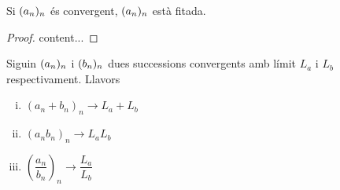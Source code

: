 \begin{prop}
	Si $({a}_n)_{n}$ és convergent, $({a}_n)_{n}$ està fitada.
	\begin{proof}
		content...
	\end{proof}
\end{prop}

\begin{prop}
	Siguin $({a}_n)_{n}$ i $({b}_n)_{n}$ dues successions convergents amb límit $L_a$ i $L_b$ respectivament. Llavors
	\begin{enumerate}[i)]
		\item $(a_n + b_n)_n \to L_a + L_b$
		\item $(a_nb_n)_n \to L_aL_b$
		\item $\left(\dfrac{a_n}{b_n}\right)_n \to \dfrac{L_a}{L_b}$
	\end{enumerate}
\end{prop}